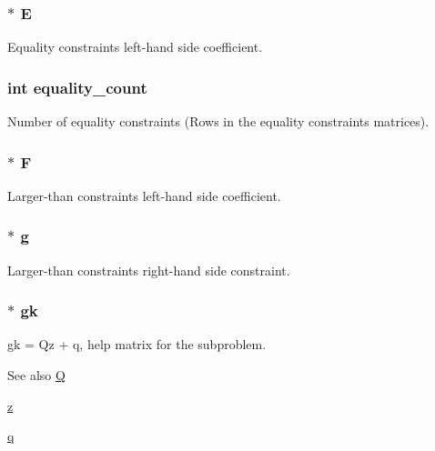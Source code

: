\subsubsection[{E}]{$\ast$ E}\label{structproblem_a1fc7c4b0ad7cae12ae26a243648cec36}
Equality constraints left-\/hand side coefficient. \hypertarget{structproblem_aa7487cc373ced36ac9f1d9ad0f7aec6a}{}
\subsubsection[{equality\+\_\+count}]{\setlength{\rightskip}{0pt plus 5cm}int equality\+\_\+count}\label{structproblem_aa7487cc373ced36ac9f1d9ad0f7aec6a}
Number of equality constraints (Rows in the equality constraints matrices). \hypertarget{structproblem_a9cba4c914ccb68d2fa56a599049b5d88}{}
\subsubsection[{F}]{$\ast$ F}\label{structproblem_a9cba4c914ccb68d2fa56a599049b5d88}
Larger-\/than constraints left-\/hand side coefficient. \hypertarget{structproblem_ab6856d3e27905889927bce25e9c93d37}{}
\subsubsection[{g}]{$\ast$ g}\label{structproblem_ab6856d3e27905889927bce25e9c93d37}
Larger-\/than constraints right-\/hand side constraint. \hypertarget{structproblem_abfbecabeb3ffaa60557898d366c79c35}{}
\subsubsection[{gk}]{$\ast$ gk}\label{structproblem_abfbecabeb3ffaa60557898d366c79c35}
gk = Qz + q, help matrix for the subproblem. \begin{DoxySeeAlso}{See also}
\hyperlink{structproblem_ae50fecd2794ca5844d6d01efcf17294c}{Q} 

\hyperlink{structproblem_a840058b5c67561185c94da497d0d3da6}{z} 

\hyperlink{structproblem_a7755407fcbd4345b31d64bbc181af35a}{q} 
\end{DoxySeeAlso}
\hypertarget{structproblem_a8e142e0ead965e30c731cac0c81f0546}{}
